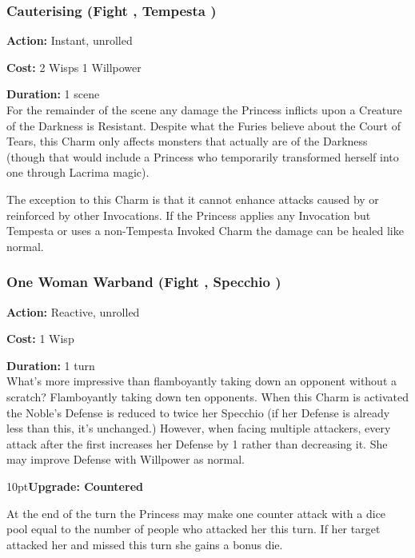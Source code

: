 \subsubsection*{Cauterising (Fight \textbullet\textbullet, Tempesta \textbullet\textbullet\textbullet)}

\noindent \textbf{Action:} Instant, unrolled

\noindent \textbf{Cost:} 2 Wisps 1 Willpower

\noindent \textbf{Duration:} 1 scene\\

For the remainder of the scene any damage the Princess inflicts upon a Creature of the Darkness is Resistant. Despite what the Furies believe about the Court of Tears, this Charm only affects monsters that actually are of the Darkness (though that would include a Princess who temporarily transformed herself into one through Lacrima magic). 

The exception to this Charm is that it cannot enhance attacks caused by or reinforced by other Invocations. If the Princess applies any Invocation but Tempesta or uses a non-Tempesta Invoked Charm the damage can be healed like normal. 

\subsubsection*{One Woman Warband (Fight \textbullet\textbullet, Specchio \textbullet\textbullet\textbullet)}

\noindent \textbf{Action:} Reactive, unrolled

\noindent \textbf{Cost:} 1 Wisp

\noindent \textbf{Duration:} 1 turn\\

\noindent What's more impressive than flamboyantly taking down an opponent without a scratch? Flamboyantly taking down ten opponents. When this Charm is activated the Noble’s Defense is reduced to twice her Specchio (if her Defense is already less than this, it’s unchanged.) However, when facing multiple attackers, every attack after the first increases her Defense by 1 rather than decreasing it. She may improve Defense with Willpower as normal.

\begin{myindentpar}{10pt}\textbf{Upgrade: Countered}

At the end of the turn the Princess may make one counter attack with a dice pool equal to the number of people who attacked her this turn. If her target attacked her and missed this turn she gains a bonus die.\end{myindentpar}

